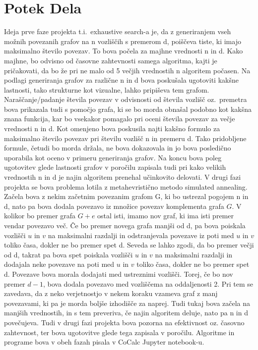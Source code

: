 \documentclass[12pt,a4paper]{amsart}
\theoremstyle{definition} %
\theoremstyle{plain} %
\begin{document}
\section{Potek Dela}

Ideja prve faze projekta t.i.\ exhaustive search-a je, da z generiranjem vseh možnih povezanih grafov na n vozliščih s premerom d, poiščeva tiste, ki 
imajo maksimalno število povezav. To bova počela za majhne vrednosti n in d. Kako majhne, bo odvisno od časovne zahtevnosti samega algoritma, kajti 
je pričakovati, da bo že pri ne malo od 5 večjih vrednostih n algoritem počasen. Na podlagi generiranja grafov za različne n in d bova poskušala
ugotoviti kakšne lastnosti, tako strukturne kot vizualne, lahko pripiševa tem grafom. Naraščanje/padanje števila povezav v odvisnosti od števila 
vozlišč oz.\ premetra bova prikazala tudi s pomočjo grafa, ki se bo morda obnašal podobno kot kakšna znana funkcija, kar bo vsekakor pomagalo pri oceni 
števila povezav za večje vrednosti n in d. Kot omenjeno bova poskusila najti kakšno formulo za maksimalno število povezav pri številu vozlišč n in premeru 
d. Tako pridobljene formule, četudi bo morda držala, ne bova dokazovala in jo bova posledično uporabila kot oceno v primeru generiranja grafov. Na koncu 
bova poleg ugotovitev glede lastnosti grafov v poročilu zapisala tudi pri kako velikih vrednostih n in d je najin algoritem prenehal učinkovito delovati. 
V drugi fazi projekta se bova problema lotila z metahevristično metodo simulated annealing. Začela bova z nekim začetnim povezanim grafom G, ki bo ustrezal 
pogojem n in d, nato pa bova dodala povezavo iz množice povezav komplementa grafa \(G\). V kolikor bo premer grafa \(G + e\) ostal isti, imamo nov graf, ki 
ima isti premer vendar povezavo več. Če bo premer novega grafa manjši od d, pa bova poiskala vozlišči \(u\) in \(v\) na maksimalni razdalji in odstranjevala 
povezave iz poti med \(u\) in \(v\) toliko časa, dokler ne bo premer spet d. Seveda se lahko zgodi, da bo premer večji od d, takrat pa bova spet poiskala 
vozlišči \(u\) in \(v\) na maksimalni razdalji in dodajala neke povezave na poti med \(u\) in \(v\) toliko časa, dokler ne bo premer spet d. Povezave bova morala 
dodajati med ustreznimi vozlišči. Torej, če bo nov premer \(d-1\), bova dodala povezavo med vozliščema na oddaljenosti 2. Pri tem se zavedava, da z neko 
verjetnostjo v nekem koraku vzameva graf z manj povezavami, ki pa je morda boljše izhodišče za naprej. Tudi tukaj bova začela na manjših vrednostih, 
in s tem preveriva, če najin algoritem deluje, nato pa n in d povečujeva. Tudi v drugi fazi projekta bova pozorna na efektivnost oz. časovno zahtevnost, ter 
bova ugotovitve glede tega zapisala v poročilu.\newline 
Algoritme in programe bova v obeh fazah pisala v CoCalc Jupyter notebook-u.
\end{document}
